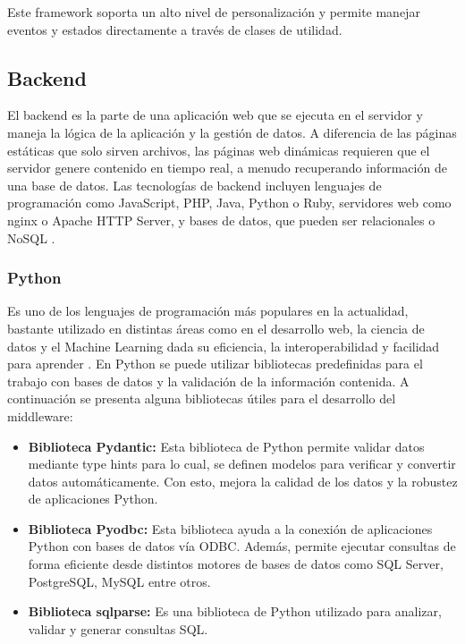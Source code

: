Este framework soporta un alto nivel de personalización y permite manejar eventos y estados directamente a través de clases de utilidad.

\subsection{Backend}
El backend es la parte de una aplicación web que se ejecuta en el servidor y maneja la lógica de la aplicación y la gestión de datos. A diferencia de las páginas estáticas que solo sirven archivos, las páginas web dinámicas requieren que el servidor genere contenido en tiempo real, a menudo recuperando información de una base de datos. Las tecnologías de backend incluyen lenguajes de programación como JavaScript, PHP, Java, Python o Ruby, servidores web como nginx o Apache HTTP Server, y bases de datos, que pueden ser relacionales o NoSQL \cite{ackermann2023full}. 

\subsubsection{Python}
Es uno de los lenguajes de programación más populares en la actualidad, bastante utilizado en distintas áreas como en el desarrollo web, la ciencia de datos y el Machine Learning dada su eficiencia, la interoperabilidad y facilidad para aprender \cite{lutz2013learning}. En Python se puede utilizar bibliotecas predefinidas para el trabajo con bases de datos y la validación de la información contenida. A continuación se presenta alguna bibliotecas útiles para el desarrollo del middleware:

\begin{itemize}
    \item \textbf{Biblioteca Pydantic:} Esta biblioteca de Python permite validar datos mediante type hints para lo cual, se definen modelos para verificar y convertir datos automáticamente. Con esto, mejora la calidad de los datos y la robustez de aplicaciones Python.

    \item \textbf{Biblioteca Pyodbc:} Esta biblioteca ayuda a la conexión de aplicaciones Python con bases de datos vía ODBC. Además, permite ejecutar consultas de forma eficiente desde distintos motores de bases de datos como SQL Server, PostgreSQL, MySQL entre otros.

    \item \textbf{Biblioteca sqlparse:} Es una biblioteca de Python utilizado para analizar, validar y generar consultas SQL.
\end{itemize}

